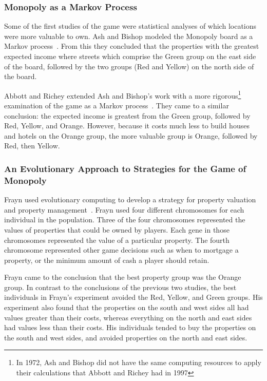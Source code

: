\subsubsection{Monopoly as a Markov Process}

Some of the first studies of the game were statistical analyses of which
locations were more valuable to own. Ash and Bishop modeled the Monopoly board
as a Markov process~\cite{Ash1972}. From this they concluded that the properties
with the greatest expected income where streets which comprise the Green group
on the east side of the board, followed by the two groups (Red and Yellow) on
the north side of the board.

Abbott and Richey extended Ash and Bishop's work with a more
rigorous\footnote{In 1972, Ash and Bishop did not have the same computing
resources to apply their calculations that Abbott and Richey had in 1997}
examination of the game as a Markov process~\cite{Abbott1997}. They came to a
similar conclusion: the expected income is greatest from the Green group,
followed by Red, Yellow, and Orange. However, because it costs much less to
build houses and hotels on the Orange group, the more valuable group is Orange,
followed by Red, then Yellow.

\subsubsection{An Evolutionary Approach to Strategies for the Game of Monopoly}

Frayn used evolutionary computing to develop a strategy for property valuation
and property management~\cite{DBLP:conf/cig/Frayn05}. Frayn used four different
chromosomes for each individual in the population. Three of the four chromosomes
represented the values of properties that could be owned by players. Each gene
in those chromosomes represented the value of a particular property. The fourth
chromosome represented other game decisions such as when to mortgage a property,
or the minimum amount of cash a player should retain.

Frayn came to the conclusion that the best property group was the Orange group.
In contrast to the conclusions of the previous two studies, the best individuals
in Frayn's experiment avoided the Red, Yellow, and Green groups. His experiment
also found that the properties on the south and west sides all had values
greater than their costs, whereas everything on the north and east sides had
values less than their costs. His individuals tended to buy the properties on
the south and west sides, and avoided properties on the north and east sides.


